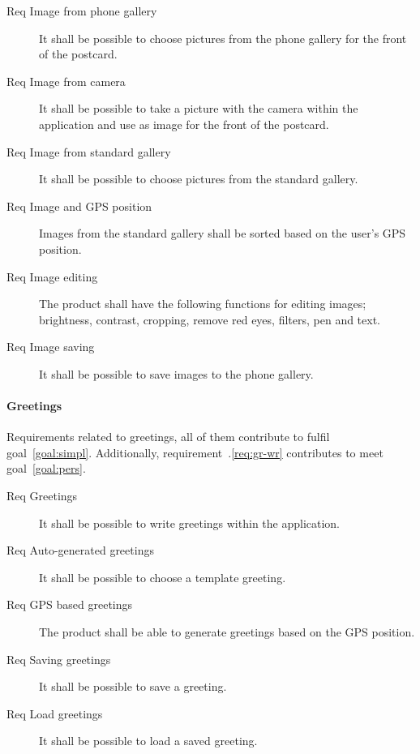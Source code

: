 \documentclass[10pt,a4paper]{article}
\begin{document}
\begin {description}
\item [Req \thesubsubsection {}  Image from phone gallery] It shall be possible to choose pictures from the phone gallery for the front of the postcard. 

\item [Req \thesubsubsection {} Image from camera] It shall be possible to take a picture with the camera within the application and use as image for the front of the postcard. 
\item [Req  Image from standard gallery] It shall be possible to choose pictures from the standard gallery.
\item [Req  Image and GPS position] Images from the standard gallery shall be sorted based on the user's GPS position.

\item [Req \thesubsubsection {} Image editing] The product shall have the following functions for editing images; brightness, contrast, cropping, remove red eyes, filters, pen and text.
\item [Req  Image saving] It shall be possible to save images to the phone gallery.
\end{description}

\paragraph{Greetings}
Requirements related to greetings, all of them contribute to fulfil goal~\ref{goal:simpl}. Additionally, requirement~\thesubsubsection .\ref{req:gr-wr} contributes to meet goal~\ref{goal:pers}.


\begin{description}
	\item [Req \thesubsubsection {} Greetings] It shall be possible to write greetings within the application.
	\item [Req  Auto-generated greetings] It shall be possible to choose a template greeting.
	\item [Req  GPS based greetings] The product shall be able to generate greetings based on the GPS position.
	\item [Req  Saving greetings] It shall be possible to save a greeting.
	\item [Req  Load greetings] It shall be possible to load a saved greeting.
\end{description}
\end{document}
